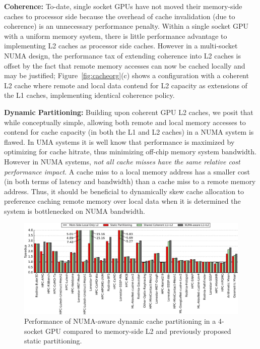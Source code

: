 \textbf{Coherence:} To-date, 
single socket GPUs have not moved their memory-side caches to processor side 
because the overhead of cache invalidation (due to coherence) is an 
unnecessary performance penalty.  Within a single socket GPU with a uniform
memory system, there is little performance advantage to implementing L2 caches
as processor side caches.  However in a multi-socket NUMA design, the performance tax
of extending coherence into L2 caches is offset by the fact that remote memory
accesses can now be cached locally and may be justified;
Figure~\ref{fig:cacheorg}(c) shows a configuration with 
a coherent L2 cache where remote and local data contend for L2 capacity as
extensions of the L1 caches, implementing identical coherence policy.

\textbf{Dynamic Partitioning:} Building upon coherent GPU L2 caches, we posit that while 
conceptually simple, allowing both remote and 
local memory accesses to contend for cache capacity (in both the L1 and L2 caches) 
in a NUMA system is flawed. In UMA systems it is well know that performance 
is maximized by optimizing for cache 
hitrate, thus minimizing off-chip memory system bandwidth. However in NUMA systems, 
\textit{not all cache misses have the same relative cost
performance impact}. A cache miss to a local memory address has a 
smaller cost (in both terms of latency and bandwidth) than a cache miss to a 
remote memory address. Thus, it should be beneficial to dynamically 
skew cache allocation to preference caching remote memory over 
local data when it is determined the system is bottlenecked on NUMA bandwidth.

\begin{figure}[t]
    \centering
    \includegraphics[width=1.0\textwidth]{figures/plot_merged_cache_WB.pdf}
    \caption{Performance of NUMA-aware dynamic cache partitioning in a 4-socket
	GPU compared to memory-side L2 and previously proposed static partitioning.}
    \label{fig:dynamiccaching}
        \vspace{-.2in}
\end{figure}

